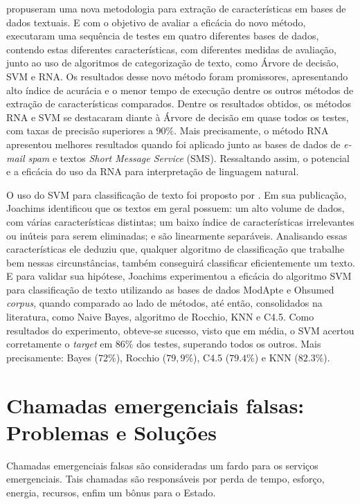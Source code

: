 \cite{uysal2012novel} propuseram uma nova metodologia para extração de características em bases de dados textuais. E com o objetivo de avaliar a eficácia do novo método, executaram uma sequência de testes em quatro diferentes bases de dados, contendo estas diferentes características, com diferentes medidas de avaliação, junto ao uso de algoritmos de categorização de texto, como Árvore de decisão, SVM e RNA. Os resultados desse novo método foram promissores, apresentando alto índice de acurácia e o menor tempo de execução dentre os outros métodos de extração de características comparados. Dentre os resultados obtidos, os métodos RNA e SVM se destacaram diante à Árvore de decisão em quase todos os testes, com taxas de precisão superiores a $90\%$. Mais precisamente, o método RNA apresentou melhores resultados quando foi aplicado junto as bases de dados de \textit{e-mail spam} e textos \textit{Short Message Service} (SMS). Ressaltando assim, o potencial e a eficácia do uso da RNA para interpretação de linguagem natural.

O uso do SVM para classificação de texto foi proposto por \cite{joachims1998text}. Em sua publicação, Joachims identificou que os textos em geral possuem: um alto volume de dados, com várias características distintas; um baixo índice de características irrelevantes ou inúteis para serem eliminadas; e são linearmente separáveis. Analisando essas características ele deduziu que, qualquer algoritmo de classificação que trabalhe bem nessas circunstâncias, também conseguirá classificar eficientemente um texto. E para validar sua hipótese, Joachims experimentou a eficácia do algoritmo SVM para classificação de texto utilizando as bases de dados ModApte e Ohsumed \textit{corpus}, quando comparado ao lado de métodos, até então, consolidados na literatura, como Naive Bayes, algoritmo de Rocchio, KNN e C4.5. Como resultados do experimento, obteve-se sucesso, visto que em média, o SVM acertou corretamente o \textit{target} em $86\%$ dos testes, superando todos os outros. Mais precisamente: Bayes ($72\%$), Rocchio ($79,9\%$), C4.5 ($79.4\%$) e KNN ($82.3\%$).

\section{Chamadas emergenciais falsas: Problemas e Soluções}
Chamadas emergenciais falsas são consideradas um fardo para os serviços emergenciais. Tais chamadas são responsáveis por perda de tempo, esforço, energia, recursos, enfim um bônus para o Estado.

